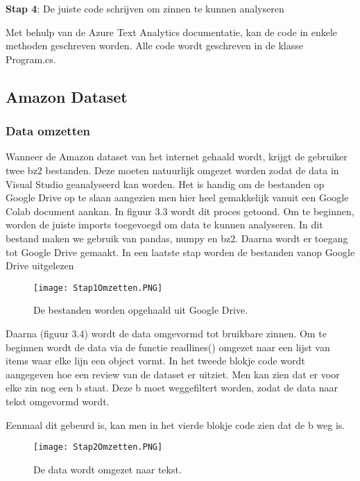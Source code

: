 \textbf{Stap 4}: De juiste code schrijven om zinnen te kunnen analyseren

Met behulp van de Azure Text Analytics documentatie, kan de code in enkele methoden geschreven worden. Alle code wordt geschreven in de klasse Program.cs. 

\subsection{Amazon Dataset}
\label{amazondatasetazure}

\subsubsection{Data omzetten}
\label{amazondatasetomzettenazure}
Wanneer de Amazon dataset van het internet gehaald wordt, krijgt de gebruiker twee bz2 bestanden. Deze moeten natuurlijk omgezet worden zodat de data in Visual Studio geanalyseerd kan worden. Het is handig om de bestanden op Google Drive op te slaan aangezien men hier heel gemakkelijk vanuit een Google Colab document aankan. In figuur 3.3 wordt dit proces getoond. Om te beginnen, worden de juiste imports toegevoegd om data te kunnen analyseren. In dit bestand maken we gebruik van pandas, numpy en bz2. Daarna wordt er toegang tot Google Drive gemaakt. In een laatste stap worden de bestanden vanop Google Drive uitgelezen

\begin{figure}[!htbp]
    \texttt{[image: Stap1Omzetten.PNG]}
    \caption{\label{stap1amazon}De bestanden worden opgehaald uit Google Drive.}
\end{figure}
\FloatBarrier

Daarna (figuur 3.4) wordt de data omgevormd tot bruikbare zinnen. Om te beginnen wordt de data via de functie readlines() omgezet naar een lijst van items waar elke lijn een object vormt. In het tweede blokje code wordt aangegeven hoe een review van de dataset er uitziet. Men kan zien dat er voor elke zin nog een b staat. Deze b moet weggefiltert worden, zodat de data naar tekst omgevormd wordt. 

Eenmaal dit gebeurd is, kan men in het vierde blokje code zien dat de b weg is.

\begin{figure}[!htbp]
    \texttt{[image: Stap2Omzetten.PNG]}
    \caption{\label{stap2amazon}De data wordt omgezet naar tekst.}
\end{figure}
\FloatBarrier

